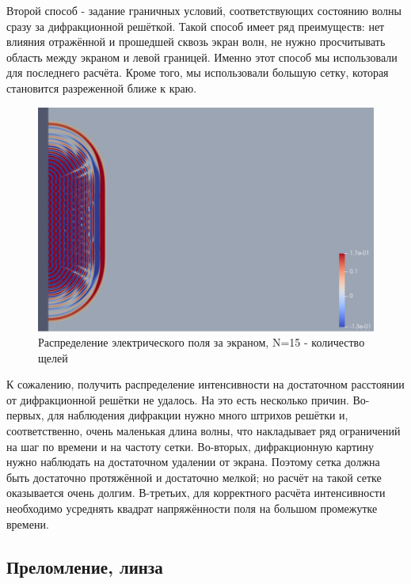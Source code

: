 \documentclass[
11pt,%
tightenlines,%
twoside,%
onecolumn,%
nofloats,%
nobibnotes,%
nofootinbib,%
superscriptaddress,%
noshowpacs,%
centertags]%
{revtex4}
\begin{document}
Второй способ - задание граничных условий, соответствующих состоянию волны сразу за дифракционной 
решёткой. Такой способ имеет ряд преимуществ: нет влияния отражённой и прошедшей сквозь экран волн, 
не нужно просчитывать область между экраном и левой границей. Именно этот способ мы использовали для 
последнего расчёта. Кроме того, мы использовали большую сетку, которая становится разреженной ближе
к краю.
\newpage
\begin{figure}[h]
    \centering
    \includegraphics[width=13cm]{N=15__27.png}
    \caption{Распределение электрического поля за экраном, N=15 - количество щелей}
    \label{fig:1}
\end{figure}
К сожалению, получить распределение интенсивности на достаточном расстоянии от дифракционной решётки не удалось. 
На это есть несколько причин. Во-первых, для наблюдения дифракции нужно много штрихов решётки 
и, соответственно, очень маленькая длина волны, что накладывает ряд ограничений на шаг по времени 
и на частоту сетки. Во-вторых, дифракционную картину нужно наблюдать на достаточном удалении от 
экрана. Поэтому сетка должна быть достаточно протяжённой и достаточно мелкой; но расчёт на такой сетке 
оказывается очень долгим. В-третьих, для корректного расчёта интенсивности необходимо усреднять 
квадрат напряжённости поля на большом промежутке времени. 

\subsection{Преломление, линза}
\end{document}

